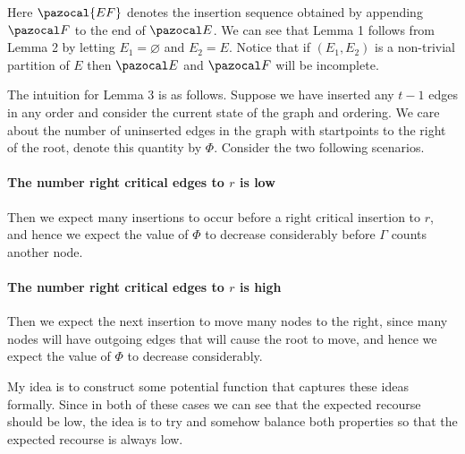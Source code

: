 \documentclass{article}
\newtheorem{lemma}{Lemma}
\DeclareMathOperator*{\polylog}{polylog}
\begin{document}
Here $\pazocal{EF}$ denotes the insertion sequence obtained by appending $\pazocal F$ to the end of $\pazocal E$. We can see that Lemma 1 follows from Lemma 2 by letting $E_1 = \varnothing$ and $E_2 = E$. Notice that if $(E_1, E_2)$ is a non-trivial partition of $E$ then $\pazocal E$ and $\pazocal F$ will be incomplete.


The intuition for Lemma 3 is as follows. Suppose we have inserted any $t-1$ edges in any order and consider the current state of the graph and ordering. We care about the number of uninserted edges in the graph with startpoints to the right of the root, denote this quantity by $\Phi$. Consider the two following scenarios.

\paragraph{The number right critical edges to $r$ is low}

Then we expect many insertions to occur before a right critical insertion to $r$, and hence we expect the value of $\Phi$ to decrease considerably before $\Gamma$ counts another node.

\paragraph{The number right critical edges to $r$ is high}

Then we expect the next insertion to move many nodes to the right, since many nodes will have outgoing edges that will cause the root to move, and hence we expect the value of $\Phi$ to decrease considerably.

My idea is to construct some potential function that captures these ideas formally. Since in both of these cases we can see that the expected recourse should be low, the idea is to try and somehow balance both properties so that the expected recourse is always low.
\end{document}

